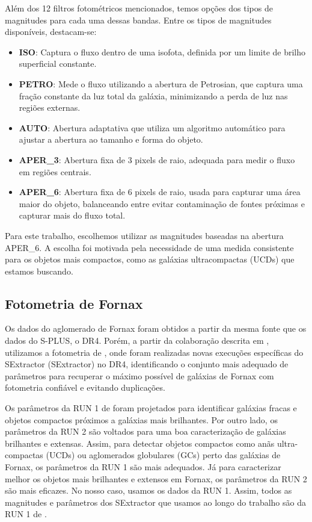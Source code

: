 Além dos 12 filtros fotométricos mencionados, temos opções dos tipos de magnitudes para cada uma dessas bandas. Entre os tipos de magnitudes disponíveis, destacam-se:

\begin{itemize}
    \item \textbf{ISO}: Captura o fluxo dentro de uma isofota, definida por um limite de brilho superficial constante.
    \item \textbf{PETRO}: Mede o fluxo utilizando a abertura de Petrosian, que captura uma fração constante da luz total da galáxia, minimizando a perda de luz nas regiões externas.
    \item \textbf{AUTO}: Abertura adaptativa que utiliza um algoritmo automático para ajustar a abertura ao tamanho e forma do objeto.
    \item \textbf{APER\_3}: Abertura fixa de 3 pixels de raio, adequada para medir o fluxo em regiões centrais.
    \item \textbf{APER\_6}: Abertura fixa de 6 pixels de raio, usada para capturar uma área maior do objeto, balanceando entre evitar contaminação de fontes próximas e capturar mais do fluxo total.
\end{itemize}

Para este trabalho, escolhemos utilizar as magnitudes baseadas na abertura APER\_6. A escolha foi motivada pela necessidade de uma medida consistente para os objetos mais compactos, como as galáxias ultracompactas (UCDs) que estamos buscando.


\subsection{Fotometria de Fornax}\label{sec:Fornax_data}
Os dados do aglomerado de Fornax foram obtidos a partir da mesma fonte que os dados do S-PLUS, o DR4. Porém, a partir da colaboração descrita em \cite{castelli2024splusfornaxprojectsfp}, utilizamos a fotometria de \cite{haack2024splusfornaxprojectsfp}, onde foram realizadas novas execuções específicas do \ac{SExtractor} (SExtractor) no DR4, identificando o conjunto mais adequado de parâmetros para recuperar o máximo possível de galáxias de Fornax com fotometria confiável e evitando duplicações.

Os parâmetros da RUN 1 de \cite{haack2024splusfornaxprojectsfp} foram projetados para identificar galáxias fracas e objetos compactos próximos a galáxias mais brilhantes. Por outro lado, os parâmetros da RUN 2 são voltados para uma boa caracterização de galáxias brilhantes e extensas. Assim, para detectar objetos compactos como anãs ultra-compactas (UCDs) ou aglomerados globulares (GCs) perto das galáxias de Fornax, os parâmetros da RUN 1 são mais adequados. Já para caracterizar melhor os objetos mais brilhantes e extensos em Fornax, os parâmetros da RUN 2 são mais eficazes. No nosso caso, usamos os dados da RUN 1. Assim, todos as magnitudes e parâmetros dos \ac{SExtractor} que usamos ao longo do trabalho são da RUN 1 de \cite{haack2024splusfornaxprojectsfp}.


